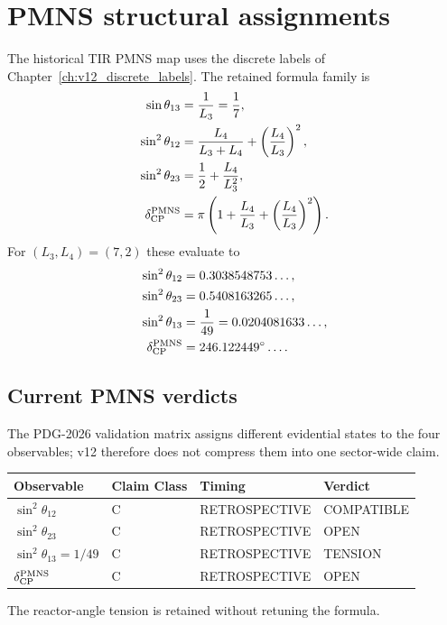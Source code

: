 \section{PMNS structural assignments}
The historical TIR PMNS map uses the discrete labels of
Chapter~\ref{ch:v12_discrete_labels}.  The retained formula family is
\begin{align}
\sin\theta_{13}
&=\frac1{L_3}=\frac17,
\label{eq:v12-pmns-theta13}\\
\sin^2\theta_{12}
&=\frac{L_4}{L_3+L_4}
+\left(\frac{L_4}{L_3}\right)^2,
\label{eq:v12-pmns-theta12}\\
\sin^2\theta_{23}
&=\frac12+\frac{L_4}{L_3^2},
\label{eq:v12-pmns-theta23}\\
\delta_{\rm CP}^{\rm PMNS}
&=\pi\left(
1+\frac{L_4}{L_3}
+\left(\frac{L_4}{L_3}\right)^2
\right).
\label{eq:v12-pmns-delta}
\end{align}
For $(L_3,L_4)=(7,2)$ these evaluate to
\begin{align}
\sin^2\theta_{12}&=0.3038548753\ldots,\\
\sin^2\theta_{23}&=0.5408163265\ldots,\\
\sin^2\theta_{13}&=\frac1{49}=0.0204081633\ldots,\\
\delta_{\rm CP}^{\rm PMNS}&=246.122449^\circ\ldots .
\end{align}

\subsection{Current PMNS verdicts}
The PDG-2026 validation matrix assigns different evidential states to the four
observables; v12 therefore does not compress them into one sector-wide claim.

{\setlength{\tabcolsep}{3pt}
\begin{longtable}{p{}p{}p{}p{}}
\toprule
Observable & Claim Class & Timing & Verdict\\
\midrule
$\sin^2\theta_{12}$ & C & RETROSPECTIVE & COMPATIBLE\\
$\sin^2\theta_{23}$ & C & RETROSPECTIVE & OPEN\\
$\sin^2\theta_{13}=1/49$ & C & RETROSPECTIVE & TENSION\\
$\delta_{\rm CP}^{\rm PMNS}$ & C & RETROSPECTIVE & OPEN\\
\bottomrule
\end{longtable}}
The reactor-angle tension is retained without retuning the formula.

